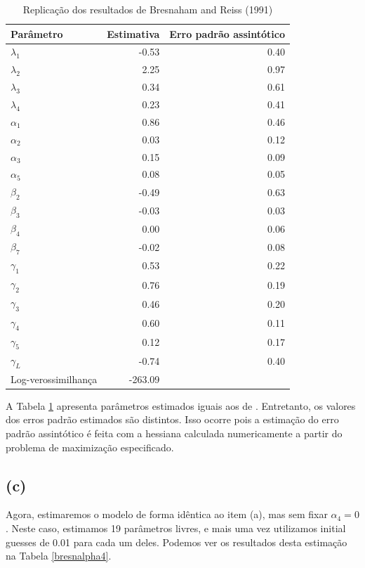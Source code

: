 \documentclass{article}
\begin{document}
\begin{table}[H]
    \centering
    \begin{tabular}{lrr}
\hline
 Parâmetro&Estimativa& Erro padrão assintótico\\
\hline
$\lambda_1$ &-0.53 & 0.40\\
$\lambda_2$ &2.25 & 0.97\\
$\lambda_3$ &0.34 & 0.61\\
$\lambda_4$ &0.23 & 0.41\\
$\alpha_1$ &0.86 & 0.46\\
$\alpha_2$ &0.03 & 0.12\\
$\alpha_3$ &0.15 & 0.09\\
$\alpha_5$ &0.08 & 0.05\\
$\beta_2$ &-0.49 & 0.63\\
$\beta_3$ &-0.03 & 0.03\\
$\beta_4$ &0.00 & 0.06\\
$\beta_7$ &-0.02 & 0.08\\
$\gamma_1$ &0.53 & 0.22\\
$\gamma_2$ &0.76 & 0.19\\
$\gamma_3$ &0.46 & 0.20\\
$\gamma_4$ &0.60 & 0.11\\
$\gamma_5$ &0.12 & 0.17\\
$\gamma_L$ &-0.74 & 0.40\\
Log-verossimilhança &-263.09&\\
\hline
\end{tabular}
    \caption{Replicação dos resultados de Bresnaham and Reiss (1991)}
    \label{repbresn}
\end{table}

A Tabela \ref{repbresn} apresenta parâmetros estimados iguais aos de . Entretanto, os valores dos erros padrão estimados são distintos. Isso ocorre pois a estimação do erro padrão assintótico é feita com a hessiana calculada numericamente a partir do problema de maximização especificado.

\subsection*{(c)}

Agora, estimaremos o modelo de forma idêntica ao item (a), mas sem fixar $\alpha_4 = 0$. Neste caso, estimamos 19 parâmetros livres, e mais uma vez utilizamos initial guesses de 0.01 para cada um deles. Podemos ver os resultados desta estimação na Tabela \ref{bresnalpha4}.
\end{document}
